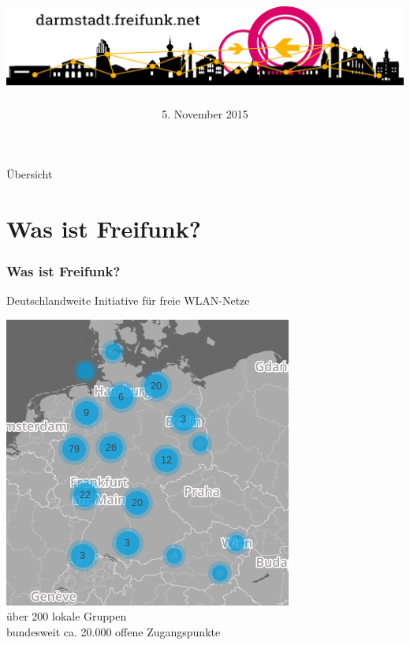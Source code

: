\documentclass[10pt]{beamer}
\title{\centering\includegraphics[width=\textwidth]{images/logo-skyline}}
\author{}
\date{\footnotesize 5. November 2015}
\begin{document}
\begin{frame}
\maketitle
\end{frame}


\begin{frame}{Übersicht}
\tableofcontents
\end{frame}

\section{Was ist Freifunk?}
\begin{frame}
	\frametitle{Was ist Freifunk?}

	Deutschlandweite Initiative für freie WLAN-Netze
	
	\pause
	\vfill
	\centering
	\includegraphics[scale=0.3]{images/2015-10_freifunk-map} \\
	über 200 lokale Gruppen\\bundesweit ca. 20.000 offene Zugangspunkte

	
\end{frame}
\end{document}
